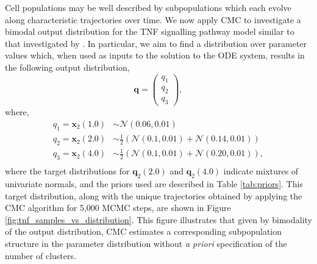 Cell populations may be well described by subpopulations which each evolve along characteristic trajectories over time. We now apply CMC to investigate a bimodal output distribution for the TNF signalling pathway model similar to that investigated by \cite{hasenauer2011identification}. In particular, we aim to find a distribution over parameter values which, when used as inputs to the solution to the ODE system, results in the following output distribution,
%
\begin{equation}
\boldsymbol{q} = \begin{pmatrix} q_1 \\ q_2 \\ q_3 \end{pmatrix},
\end{equation}
where,
\begin{equation}
\begin{aligned}
q_1 = \boldsymbol{x}_2(1.0) &\sim \mathcal{N}(0.06, 0.01)\\
q_2 = \boldsymbol{x}_2(2.0) &\sim\frac{1}{2}\left(\mathcal{N}(0.1, 0.01) + \mathcal{N}(0.14, 0.01)\right)\\
q_3 = \boldsymbol{x}_2(4.0) &\sim\frac{1}{2}\left(\mathcal{N}(0.1, 0.01) + \mathcal{N}(0.20, 0.01)\right),\\
\end{aligned}
\end{equation}
%
where the target distributions for $\boldsymbol{q}_2(2.0)$ and $\boldsymbol{q}_2(4.0)$ indicate mixtures of univariate normals, and the priors used are described in Table \ref{tab:priors}. This target distribution, along with the unique trajectories obtained by applying the CMC algorithm for 5,000 MCMC steps, are shown in Figure \ref{fig:tnf_samples_vs_distribution}. This figure illustrates that given by bimodality of the output distribution, CMC estimates a corresponding subpopulation structure in the parameter distribution without \textit{a priori} specification of the number of clusters.

